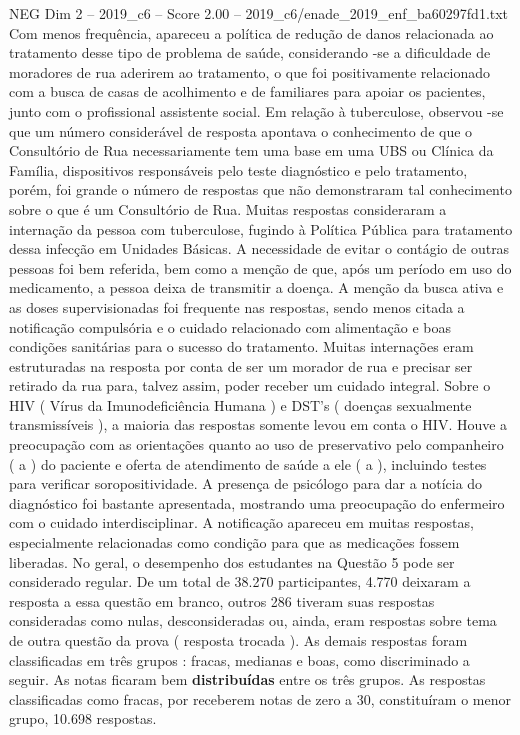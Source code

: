 \begin{textsample}{NEG Dim 2 – 2019\_c6 – Score 2.00 – 2019\_c6/enade\_2019\_enf\_ba60297fd1.txt}
Com menos frequência, apareceu a política de redução de danos relacionada ao tratamento desse tipo de problema de saúde, considerando -se a dificuldade de moradores de rua aderirem ao tratamento, o que foi positivamente relacionado com a busca de casas de acolhimento e de familiares para apoiar os pacientes, junto com o profissional assistente social.
Em relação à tuberculose, observou -se que um número considerável de resposta apontava o conhecimento de que o Consultório de Rua necessariamente tem uma base em uma UBS ou Clínica da Família, dispositivos responsáveis pelo teste diagnóstico e pelo tratamento, porém, foi grande o número de respostas que não demonstraram tal conhecimento sobre o que é um Consultório de Rua.
Muitas respostas consideraram a internação da pessoa com tuberculose, fugindo à Política Pública para tratamento dessa infecção em Unidades Básicas.
A necessidade de evitar o contágio de outras pessoas foi bem referida, bem como a menção de que, após um período em uso do medicamento, a pessoa deixa de transmitir a doença.
A menção da busca ativa e as doses supervisionadas foi frequente nas respostas, sendo menos citada a notificação compulsória e o cuidado relacionado com alimentação e boas condições sanitárias para o sucesso do tratamento.
Muitas internações eram estruturadas na resposta por conta de ser um morador de rua e precisar ser retirado da rua para, talvez assim, poder receber um cuidado integral.
Sobre o HIV ( Vírus da Imunodeficiência Humana ) e DST’s ( doenças sexualmente transmissíveis ), a maioria das respostas somente levou em conta o HIV.
Houve a preocupação com as orientações quanto ao uso de preservativo pelo companheiro ( a ) do paciente e oferta de atendimento de saúde a ele ( a ), incluindo testes para verificar soropositividade.
A presença de psicólogo para dar a notícia do diagnóstico foi bastante apresentada, mostrando uma preocupação do enfermeiro com o cuidado interdisciplinar.
A notificação apareceu em muitas respostas, especialmente relacionadas como condição para que as medicações fossem liberadas.
No geral, o desempenho dos estudantes na Questão 5 pode ser considerado regular.
De um total de 38.270 participantes, 4.770 deixaram a resposta a essa questão em branco, outros 286 tiveram suas respostas consideradas como nulas, desconsideradas ou, ainda, eram respostas sobre tema de outra questão da prova ( resposta trocada ).
As demais respostas foram classificadas em três grupos : fracas, medianas e boas, como discriminado a seguir.
As notas ficaram bem \textbf{distribuídas} entre os três grupos.
As respostas classificadas como fracas, por receberem notas de zero a 30, constituíram o menor grupo, 10.698 respostas.

\end{textsample}
